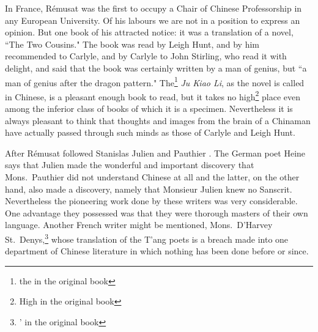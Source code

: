 In France, R\'emusat  was the first to occupy a Chair of Chinese Professorship in any European University.
Of his labours we are not in a position to express an opinion.
But one book of his attracted notice: it was a translation of a novel, ``The Two Cousins."
The book was read by Leigh Hunt, and by him recommended to Carlyle, and by Carlyle to John Stirling, who read it with delight, and said that the book was certainly written by a man of genius, but ``a man of genius after the dragon pattern."
The\footnote{the in the original book} \emph{Ju Kiao Li}, as the novel is called in Chinese, is a pleasant enough book to read, but it takes no high\footnote{High in the original book} place even among the inferior class of books of which it is a specimen.
Nevertheless it is always pleasant to think that thoughts and images from the brain of a Chinaman have actually passed through such minds as those of Carlyle and Leigh Hunt.

After R\'emusat followed Stanislas Julien  and Pauthier .
The German poet Heine says that Julien made the wonderful and important discovery that Mons.~Pauthier  did not understand Chinese at all and the latter, on the other hand, also made a discovery, namely that Monsieur Julien knew no Sanscrit.
Nevertheless the pioneering work done by these writers was very considerable.
One advantage they possessed was that they were thorough masters of their own language.
Another French writer might be mentioned, Mons.~D'Harvey St.~Denys,\footnote{' in the original book}   whose translation of the T'ang poets is a breach made into one department of Chinese literature in which nothing has been done before or since.

